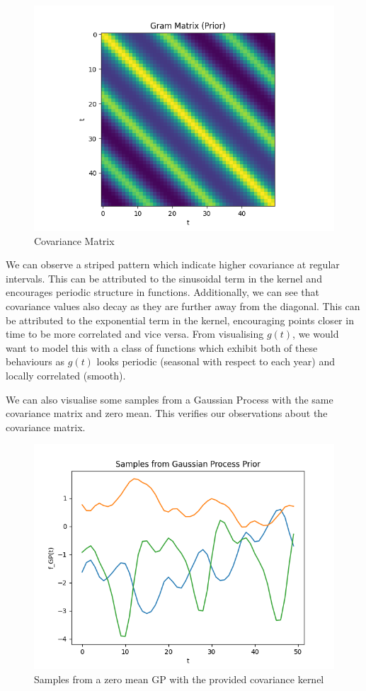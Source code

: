 \documentclass[12pt]{article}
\begin{document}
\begin{figure}[h]
\centering
\includegraphics[scale=0.5]{outputs/q2/c-gram-matrix}
\caption{Covariance Matrix}
\label{fig:c-gram-matrix}
\end{figure}

We can observe a striped pattern which indicate higher covariance at regular intervals.
This can be attributed to the sinusoidal term in the kernel and encourages periodic structure in functions.
Additionally, we can see that covariance values also decay as they are further away from the diagonal.
This can be attributed to the exponential term in the kernel, encouraging points closer in time to be more correlated and vice versa.
From visualising $g(t)$, we would want to model this with a class of functions which exhibit both of these behaviours as $g(t)$ looks periodic (seasonal with respect to each year) and locally correlated (smooth).

We can also visualise some samples from a Gaussian Process with the same covariance matrix and zero mean.
This verifies our observations about the covariance matrix.

\begin{figure}[h]
\centering
\includegraphics[scale=0.5]{outputs/q2/c-samples}
\caption{Samples from a zero mean GP with the provided covariance kernel}
\label{fig:c-samples}
\end{figure}
\end{document}
